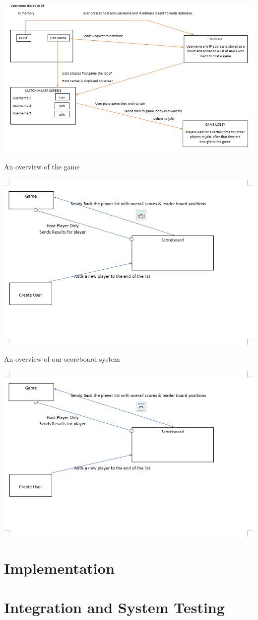 \includegraphics[width=1\columnwidth]{img/redisMatch.PNG}

An overview of the game

\includegraphics[width=1\columnwidth]{img/MariaDBPic.PNG}

An overview of our scoreboard system

\includegraphics[width=1\columnwidth]{img/MariaDBPic.PNG}

\newpage
\section{Implementation}

\newpage
\section{Integration and System Testing}